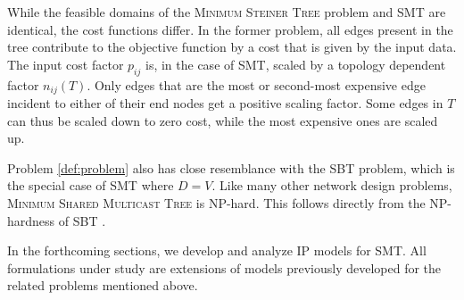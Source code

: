 While the feasible domains of the \textsc{Minimum Steiner Tree} problem and SMT are identical,
the cost functions differ.
In the former problem, all edges present in the tree contribute to the objective function by a cost that is given by the input data.
The input cost factor $p_{ij}$ is, in the case of SMT, scaled by a topology dependent factor $n_{ij}(T)$.
Only edges that are the most or second-most expensive edge incident to either of their end nodes get a positive scaling factor.
Some edges in $T$ can thus be scaled down to zero cost, while the most expensive ones are scaled up.

Problem \ref{def:problem} also has close resemblance with the SBT problem, which is the special case of SMT where $D=V$.
Like many other network design problems, \textsc{Minimum Shared Multicast Tree} is NP-hard.
This follows directly from the NP-hardness of SBT \citep{Papadimitriou06SBT}.


In the forthcoming sections, we develop and analyze IP models for SMT.
All formulations under study are extensions of models previously developed for the related problems mentioned above.
